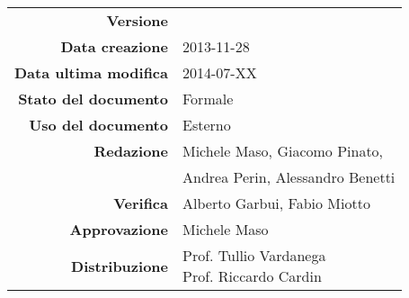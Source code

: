 

\newcommand{\Versione}{\versioneGlossario{}}
\newcommand{\Data}{2013-11-28}
\newcommand{\DataUltimaModifica}{2014-07-XX}
\newcommand{\TipoDocumento}{Glossario}
\newcommand{\Lettera}[1]{\huge #1}
\newcommand{\Riga}{\\\rule[2mm]{\textwidth}{0.25mm}}
\newcommand{\Termine}{\emph}
\newcommand{\Inizio}{}

\newcommand{\paginaGlossario}[1]{
\newpage
\setcounter{secnumdepth}{0} %
\section{\Lettera{#1}}
}

\newcommand{\elemento}[2]{
\setcounter{secnumdepth}{0} %
\subsection{#1}
\begin{quote}
{#2}
\end{quote}
}



\begin{center}

\begin{tabular}{r|l}
\textbf{Versione} & \Versione\\
\textbf{Data creazione} & \Data \\
\textbf{Data ultima modifica} & \DataUltimaModifica \\
\textbf{Stato del documento} & Formale \\
\textbf{Uso del documento} & Esterno \\
\textbf{Redazione} & Michele Maso, Giacomo Pinato,\\
                   & Andrea Perin, Alessandro Benetti\\
\textbf{Verifica} & Alberto Garbui, Fabio Miotto \\
\textbf{Approvazione} & Michele Maso \\
\textbf{Distribuzione} & \parbox[t]{4cm}{Prof. Tullio Vardanega \\ Prof. Riccardo Cardin \\ \Prop{} } \\
\end{tabular}
\end{center}
\vspace{.01in}

